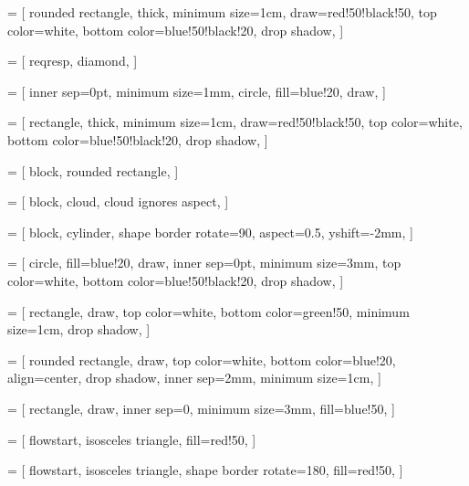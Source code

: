  = [
rounded rectangle,
thick,
minimum size=1cm,
draw=red!50!black!50,
top color=white,
bottom color=blue!50!black!20,
drop shadow,
]

 = [
reqresp,
diamond,
]

 = [
inner sep=0pt,
minimum size=1mm,
circle,
fill=blue!20,
draw,
]

 = [
rectangle,
thick,
minimum size=1cm,
draw=red!50!black!50,
top color=white,
bottom color=blue!50!black!20,
drop shadow,
]

 = [
block,
rounded rectangle,
]

 = [
block,
cloud,
cloud ignores aspect,
]

 = [
block,
cylinder,
shape border rotate=90,
aspect=0.5,
yshift=-2mm,
]

 = [
circle,
fill=blue!20,
draw,
inner sep=0pt,
minimum size=3mm,
top color=white,
bottom color=blue!50!black!20,
drop shadow,
]

 = [
rectangle,
draw,
top color=white,
bottom color=green!50,
minimum size=1cm,
drop shadow,
]

 = [
rounded rectangle,
draw,
top color=white,
bottom color=blue!20,
align=center,
drop shadow,
inner sep=2mm,
minimum size=1cm,
]

 = [
rectangle,
draw,
inner sep=0,
minimum size=3mm,
fill=blue!50,
]

 = [
flowstart,
isosceles triangle,
fill=red!50,
]

 = [
flowstart,
isosceles triangle,
shape border rotate=180,
fill=red!50,
]

\newcommand{\flow}[6]
{
\node[flowstart] (s#2) at (#3,-#2){};
\node[flowend-#1](e#2) at (#4,-#2){};
\path (s#2) edge node(m#2){} (e#2){};
\node[above,align=left](a#2) at  (m#2){\texttt{#5}};
\node[below,align=left](b#2) at  (m#2){\texttt{#6}};
}